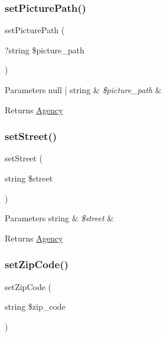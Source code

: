 \subsubsection{\texorpdfstring{setPicturePath()}{setPicturePath()}}
{\footnotesize\ttfamily set\+Picture\+Path (\begin{DoxyParamCaption}\item[{?string}]{\$picture\+\_\+path }\end{DoxyParamCaption})}


\begin{DoxyParams}[1]{Parameters}
null | string & {\em \$picture\+\_\+path} & \\
\hline
\end{DoxyParams}
\begin{DoxyReturn}{Returns}
\mbox{\hyperlink{class_app_1_1_entity_1_1_agency}{Agency}} 
\end{DoxyReturn}
\mbox{\label{class_app_1_1_entity_1_1_agency_a1e2c497b60c59cc6e466d366ced3a61e}} 
\subsubsection{\texorpdfstring{setStreet()}{setStreet()}}
{\footnotesize\ttfamily set\+Street (\begin{DoxyParamCaption}\item[{string}]{\$street }\end{DoxyParamCaption})}


\begin{DoxyParams}[1]{Parameters}
string & {\em \$street} & \\
\hline
\end{DoxyParams}
\begin{DoxyReturn}{Returns}
\mbox{\hyperlink{class_app_1_1_entity_1_1_agency}{Agency}} 
\end{DoxyReturn}
\mbox{\label{class_app_1_1_entity_1_1_agency_a38974ca863b9f65abf0d5cf642688eb0}} 
\subsubsection{\texorpdfstring{setZipCode()}{setZipCode()}}
{\footnotesize\ttfamily set\+Zip\+Code (\begin{DoxyParamCaption}\item[{string}]{\$zip\+\_\+code }\end{DoxyParamCaption})}


